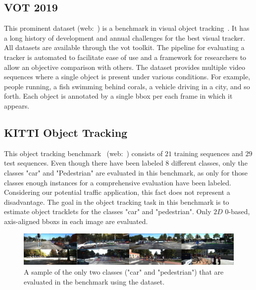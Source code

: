 \subsection{VOT 2019}
\label{ssec:DatasetVOT2019}


This prominent dataset (web:~\cite{vot2019dataset}) is a benchmark in visual object tracking~\cite{Kristan2019a}. It has a long history of development and annual challenges for the best visual tracker. All  datasets are available through the \gls{vot} toolkit. The pipeline for evaluating a tracker is automated to facilitate ease of use and a framework for researchers to allow an objective comparison with others. The dataset provides multiple video sequences where a single object is present under various conditions. For example, people running, a fish swimming behind corals, a vehicle driving in a city, and so forth. Each object is annotated by a single \gls{bbox} per each frame in which it appears.

\subsection{KITTI Object Tracking}
\label{ssec:DatasetKITTIObjectTracking}

This object tracking benchmark~\cite{Geiger2012CVPR} (web:~\cite{kittiobjecttrackingdataset}) consists of $21$ training sequences and $29$ test sequences. Even though there have been labeled $8$ different classes, only the classes "car" and "Pedestrian" are evaluated in this benchmark, as only for those classes enough instances for a comprehensive evaluation have been labeled. Considering our potential traffic application, this fact does not represent a disadvantage. The goal in the object tracking task in this benchmark is to estimate object tracklets for the classes "car" and "pedestrian". Only $2D$ $0$-based, axis-aligned \glspl{bbox} in each image are evaluated.

\begin{figure}[t]
    \centerline{\includegraphics[width=\linewidth]{figures/datasets/kitti_object_tracking_sample.jpg}}
    \caption[ dataset]{A sample of the only two classes ("car" and "pedestrian") that are evaluated in the benchmark using the  dataset. }
    \label{fig:DatasetKITTIObjectTracking}
\end{figure}

